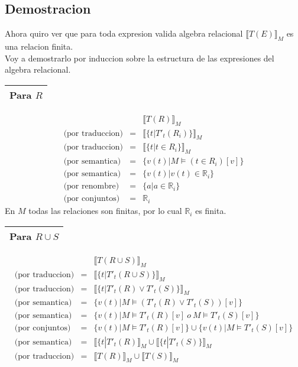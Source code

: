 \documentclass[a4paper]{article}
\newcommand{\RE}{\mathbb{R}}
\begin{document}
	\subsection{Demostracion}
	Ahora quiro ver que para toda expresion valida algebra relacional $ \llbracket T(E)\rrbracket _M $ es una relacion finita.\\
	Voy a demostrarlo por induccion sobre la estructura de las expresiones del algebra relacional.
%	
	\begin{center}
	\begin{tabular}{p{12cm}}
	\hline
	\textbf{Para $R$} \\
	\hline
	\end{tabular}
	\end{center}
%		
		\begin{eqnarray*}
			&& \llbracket T(R)\rrbracket _M \\
			\mbox{(por traduccion)} & = & \llbracket \{t|T'_t(R_i)\}\rrbracket _M \\
			\mbox{(por traduccion)} & = & \llbracket \{t|t \in R_i\}\rrbracket _M \\
			\mbox{(por semantica)} & = & \{v(t)|M \models (t \in R_i)[v]\} \\
			\mbox{(por semantica)} & = & \{v(t)|v(t) \in \RE_i\} \\
			\mbox{(por renombre)} & = & \{a|a \in \RE_i\} \\
			\mbox{(por conjuntos)} & = & \RE_i
		\end{eqnarray*}
		En $M$ todas las relaciones son finitas, por lo cual $\RE_i$ es finita.
%
	\begin{center}
	\begin{tabular}{p{12cm}}
	\hline
	\textbf{Para $R \cup S$} \\
	\hline
	\end{tabular}
	\end{center}
%	
		\begin{eqnarray*}
			&& \llbracket T(R \cup S)\rrbracket _M \\
			\mbox{(por traduccion)} & = & \llbracket \{t|T'_t(R \cup S)\}\rrbracket _M \\
			\mbox{(por traduccion)} & = & \llbracket \{t|T'_t(R)\vee T'_t(S)\}\rrbracket _M \\
			\mbox{(por semantica)} & = & \{v(t)|M \models (T'_t(R)\vee T'_t(S))[v]\} \\
			\mbox{(por semantica)} & = & \{v(t)|M \models T'_t(R)[v] \ o \ M \models T'_t(S)[v]\} \\
			\mbox{(por conjuntos)} & = & \{v(t)|M \models T'_t(R)[v]\} \cup \{v(t)|M \models T'_t(S)[v]\} \\
			\mbox{(por semantica)} & = & \llbracket \{t|T'_t(R)\rrbracket _M \cup \llbracket \{t|T'_t(S)\}\rrbracket _M \\
			\mbox{(por traduccion)} & = & \llbracket T(R)\rrbracket _M \cup \llbracket T(S)\rrbracket _M
		\end{eqnarray*}
\end{document}
